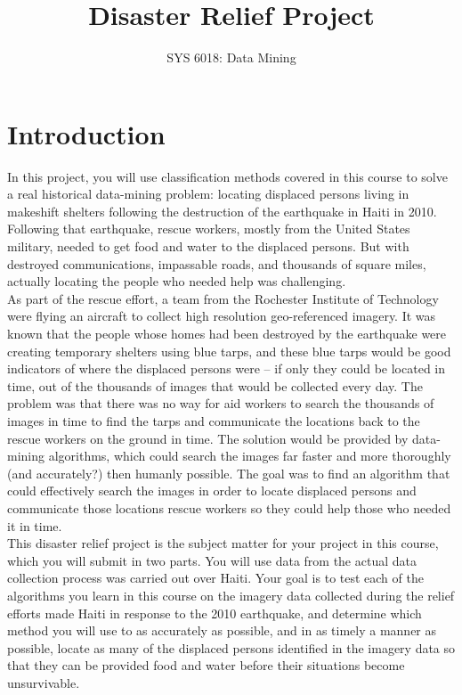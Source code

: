 \documentclass[11pt, oneside]{article}   	%
\title{Disaster Relief Project}
\author{SYS 6018: Data Mining}
\begin{document}
\maketitle

\section{Introduction}

In this project, you will use classification methods covered in this course to solve a real historical data-mining problem: locating displaced persons living in makeshift shelters following the destruction of the earthquake in Haiti in 2010.\\

\noindent Following that earthquake, rescue workers, mostly from the United States military, needed to get food and water to the displaced persons. But with destroyed communications, impassable roads, and thousands of square miles, actually locating the people who needed help was challenging.\\

\noindent As part of the rescue effort, a team from the Rochester Institute of Technology were flying an aircraft to collect high resolution geo-referenced imagery. It was known that the people whose homes had been destroyed by the earthquake were creating temporary shelters using blue tarps, and these blue tarps would be good indicators of where the displaced persons were -- if only they could be located in time, out of the thousands of images that would be collected every day. The problem was that there was no way for aid workers to search the thousands of images in time to find the tarps and communicate the locations back to the rescue workers on the ground in time. The solution would be provided by data-mining algorithms, which could search the images far faster and more thoroughly (and accurately?) then humanly possible. The goal was to find an algorithm that could effectively search the images in order to locate displaced persons and communicate those locations rescue workers so they could help those who needed it in time.\\

\noindent This disaster relief project is the subject matter for your project in this course, which you will submit in two parts. You will use data from the actual data collection process was carried out over Haiti. Your goal is to test each of the algorithms you learn in this course on the imagery data collected during the relief efforts made Haiti in response to the 2010 earthquake, and determine which method you will use to as accurately as possible, and in as timely a manner as possible, locate as many of the displaced persons identified in the imagery data so that they can be provided food and water before their situations become unsurvivable.  \\
\end{document}

